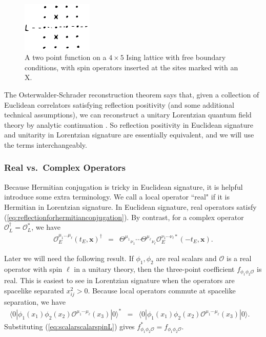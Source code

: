 \documentclass[11pt]{ws-rv9x6}
\newcommand\be{\begin{eqnarray}}
\newcommand\ee{\end{eqnarray}}
\newcommand\f\phi
\newcommand\cO{\mathcal{O}}
\newcommand\<\langle
\renewcommand\>\rangle
\newcommand\bx{\mathbf{x}}
\renewcommand\.{\cdot}
\newcommand\x\times
\begin{document}
\begin{figure}
\begin{center}
\includegraphics[width=0.3\textwidth]{isingreflectioncorrelator.jpg}
\end{center}
\caption{A two point function on a $4\x 5$ Ising lattice with free boundary conditions, with spin operators  inserted at the sites marked with an X.  \label{fig:isingreflectioncorrelator}}
\end{figure}

The Osterwalder-Schrader reconstruction theorem says that, given a collection of Euclidean correlators satisfying reflection positivity (and some additional technical assumptions), we can reconstruct a unitary Lorentzian quantum field theory by analytic continuation \cite{GlimmJaffe}.  So reflection positivity in Euclidean signature and unitarity in Lorentzian signature are essentially equivalent, and we will use the terms interchangeably. 

\subsubsection{Real vs.\ Complex Operators}
\label{sec:realvscomplex}

Because Hermitian conjugation is tricky in Euclidean signature, it is helpful introduce some extra terminology.  We call a local operator ``real" if it is Hermitian in Lorentzian signature.  In Euclidean signature, real operators satisfy (\ref{eq:reflectionforhermitianconjugation}).  By contrast, for a complex operator $\cO_L^\dag = \cO_L^*$, we have
\be
\cO_E^{\mu_1\dots\mu_\ell}(t_E,\bx)^\dag &=& \Theta^{\mu_1}{}_{\nu_1}\cdots \Theta^{\mu_\ell}{}_{\nu_\ell} \cO_E^{\nu_1\cdots\nu_\ell*}(-t_E,\bx).
\ee

Later we will need the following result.
If $\f_1,\f_2$ are real scalars and $\cO$ is a real operator with spin $\ell$ in a unitary theory, then the three-point coefficient $f_{\f_1\f_2\cO}$ is real. This is easiest to see in Lorentzian signature when the operators are spacelike separated $x_{ij}^2>0$. Because local operators commute at spacelike separation, we have
\be
\<0|\f_1(x_1)\f_2(x_2) \cO^{\mu_1\cdots\mu_\ell}(x_3)|0\>^* &=& \<0|\f_1(x_1)\f_2(x_2) \cO^{\mu_1\cdots\mu_\ell}(x_3)|0\>.\quad
\ee
Substituting (\ref{eq:scalarscalarspinL}) gives $f_{\f_1\f_2\cO}^*=f_{\f_1\f_2\cO}$.
\end{document}
